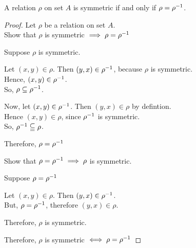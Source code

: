 \documentclass{report}
\begin{document}

\pagebreak
\Lemma A relation $\rho$ on set $A$ is symmetric if and only if $\rho=\rho^{-1}$.
\begin{proof}
	Let $\rho$ be a relation on set $A$. \\
	Show that $\rho$ is symmetric $\implies \rho=\rho^{-1}$
	\begin{list}{}{\rightmargin\leftmargin\topsep=4pt}\item
		Suppose $\rho$ is symmetric. 

		Let $(x,y)\in\rho$. Then $(y,x)\in\rho^{-1}$, because $\rho$ is symmetric. \\
		Hence, $(x,y)\in\rho^{-1}$. \\
		So, $\rho\subseteq\rho^{-1}$. 

		Now, let $(x,y)\in\rho^{-1}$. Then $(y,x)\in\rho$ by defintion. \\
		Hence $(x,y)\in\rho$, since $\rho^{-1}$ is symmetric. \\
		So, $\rho^{-1}\subseteqq\rho$.

		Therefore, $\rho=\rho^{-1}$
	\end{list}
	Show that $\rho=\rho^{-1}\implies\rho$ is symmetric.
	\begin{list}{}{\rightmargin\leftmargin\topsep=4pt}\item 
		Suppose $\rho=\rho^{-1}$

		Let $(x,y)\in\rho$. Then $(y,x)\in\rho^{-1}$. \\
		But, $\rho=\rho^{-1}$, therefore $(y,x)\in\rho$.

		Therefore, $\rho$ is symmetric.
	\end{list}
	Therefore, $\rho$ is symmetric $\iff\rho=\rho^{-1}$
\end{proof}
\end{document}

